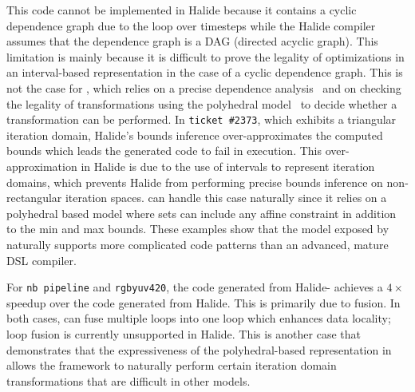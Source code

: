This code cannot be implemented in Halide because it contains a cyclic dependence graph due to the loop over timesteps while the Halide compiler assumes that the dependence graph is a DAG (directed acyclic graph).  This limitation is mainly because it is difficult to prove the legality of optimizations in an interval-based representation in the case of a cyclic dependence graph.  This is not the case for \framework{}, which relies on a precise dependence analysis~\cite{feautrier_dataflow_1991} and on checking the legality of transformations using the polyhedral model~\cite{konrad_elimination_2011} to decide whether a transformation can be performed.
In \texttt{ticket \#2373}, which exhibits a triangular iteration domain,  Halide's bounds inference over-approximates the computed bounds which leads the generated code to fail in execution.  This over-approximation in Halide is due to the use of intervals to represent iteration domains, which prevents Halide from performing precise bounds inference on non-rectangular iteration spaces.  \framework{} can handle this case naturally since it relies on a polyhedral based model where sets can include any affine constraint  in addition to the min and max bounds.  These examples show that the model exposed by \framework{} naturally supports more complicated code patterns than an advanced, mature DSL compiler.



For \texttt{nb pipeline} and \texttt{rgbyuv420}, the code generated from Halide-\framework{} achieves a $4\times$ speedup over the code generated from Halide.  This is primarily due to fusion. In both cases, \framework{} can fuse multiple loops into one loop which enhances data locality;  loop fusion is currently unsupported in Halide.  This is another case that demonstrates that the expressiveness of the polyhedral-based representation in \framework{} allows the framework to naturally perform certain iteration domain transformations that are difficult in other models.

